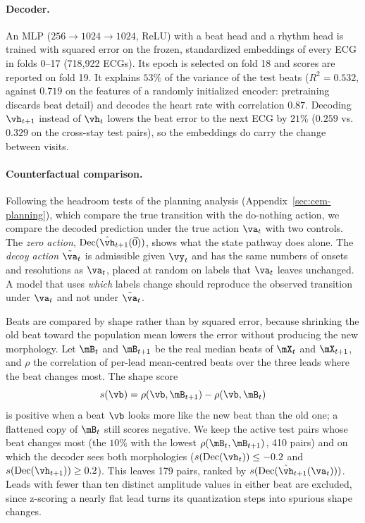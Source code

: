 \paragraph{Decoder.} An MLP ($256\to1024\to1024$, ReLU) with a beat head and a rhythm head is trained with squared error on the frozen, standardized embeddings of every ECG in folds 0--17 (718{,}922 ECGs). Its epoch is selected on fold 18 and scores are reported on fold 19. It explains $53\%$ of the variance of the test beats ($R^2=0.532$, against $0.719$ on the features of a randomly initialized encoder: pretraining discards beat detail) and decodes the heart rate with correlation $0.87$. Decoding $\vh_{t+1}$ instead of $\vh_t$ lowers the beat error to the next ECG by $21\%$ ($0.259$ vs.\ $0.329$ on the cross-stay test pairs), so the embeddings do carry the change between visits.

\paragraph{Counterfactual comparison.} Following the headroom tests of the planning analysis (Appendix~\ref{sec:cem-planning}), which compare the true transition with the do-nothing action, we compare the decoded prediction under the true action $\va_t$ with two controls. The \emph{zero action}, $\text{Dec}(\hat{\vh}_{t+1}(\vec 0))$, shows what the state pathway does alone. The \emph{decoy action} $\tilde{\va}_t$ is admissible given $\vy_t$ and has the same numbers of onsets and resolutions as $\va_t$, placed at random on labels that $\va_t$ leaves unchanged. A model that uses \emph{which} labels change should reproduce the observed transition under $\va_t$ and not under $\tilde{\va}_t$.

Beats are compared by shape rather than by squared error, because shrinking the old beat toward the population mean lowers the error without producing the new morphology. Let $\mB_t$ and $\mB_{t+1}$ be the real median beats of $\mX_t$ and $\mX_{t+1}$, and $\rho$ the correlation of per-lead mean-centred beats over the three leads where the beat changes most. The shape score
\[
s(\vb)=\rho(\vb,\mB_{t+1})-\rho(\vb,\mB_t)
\]
is positive when a beat $\vb$ looks more like the new beat than the old one; a flattened copy of $\mB_t$ still scores negative. We keep the active test pairs whose beat changes most (the $10\%$ with the lowest $\rho(\mB_t,\mB_{t+1})$, 410 pairs) and on which the decoder sees both morphologies ($s(\text{Dec}(\vh_t))\le-0.2$ and $s(\text{Dec}(\vh_{t+1}))\ge0.2$). This leaves 179 pairs, ranked by $s(\text{Dec}(\hat{\vh}_{t+1}(\va_t)))$. Leads with fewer than ten distinct amplitude values in either beat are excluded, since z-scoring a nearly flat lead turns its quantization steps into spurious shape changes.

